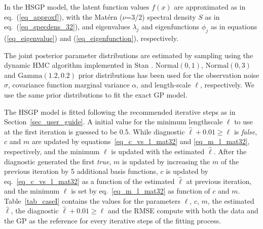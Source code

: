 In the HSGP model, the latent function values $f(x)$ are approximated as in eq.~(\ref{eq_approxf}), with the Mat{\'e}rn ($\nu$=3/2) spectral density $S$ as in eq.~(\ref{eq_specdens_32}), and eigenvalues $\lambda_j$ and eigenfunctions $\phi_j$ as in equations (\ref{eq_eigenvalue}) and (\ref{eq_eigenfunction}), respectively.  %

The joint posterior parameter distributions are estimated by sampling using the dynamic HMC algorithm implemented in Stan \citep{StanTeam:2021}. $\mathrm{Normal}(0,1)$, $\mathrm{Normal}(0,3)$ and $\mathrm{Gamma}(1.2,0.2)$ prior distributions has been used for the observation noise $\sigma$, covariance function marginal variance $\alpha$, and length-scale $\ell$, respectively. We use the same prior distributions to fit the exact GP model.

The HSGP model is fitted following the recommended iterative steps as in Section~\ref{sec_user_guide}. A initial value for the minimum lengthscale $\ell$ to use at the first iteration is guessed to be 0.5. While diagnostic $\hat{\ell} + 0.01 \geq \ell$ is \textit{false}, $c$ and $m$ are updated by equations~\eqref{eq_c_vs_l_mat32} and \eqref{eq_m_l_mat32}, respectively, and the minimum $\ell$ is updated with the estimated $\hat{\ell}$. After the diagnostic generated the first \textit{true}, $m$ is updated by increasing the $m$ of the previous iteration by 5 additional basis functions, $c$ is updated by eq.~\eqref{eq_c_vs_l_mat32} as a function of the estimated $\hat{\ell}$ at previous iteration, and the minimum $\ell$ is set by eq.~\eqref{eq_m_l_mat32} as function of $c$ and $m$. Table~\ref{tab_caseI} contains the values for the parameters $\ell$, $c$, $m$, the estimated $\hat{\ell}$, the diagnostic $\hat{\ell} + 0.01 \geq \ell$ and the RMSE compute with both the data and the GP as the reference for every iterative steps of the fitting process.

